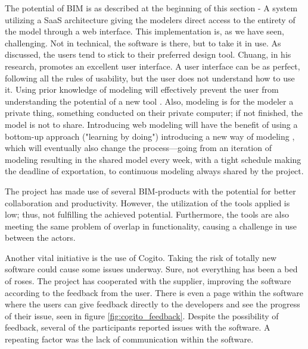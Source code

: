 The potential of BIM is as described at the beginning of this section - A system utilizing a SaaS architecture giving the modelers direct access to the entirety of the model through a web interface. This implementation is, as we have seen, challenging. Not in technical, the software is there, but to take it in use. As discussed, the users tend to stick to their preferred design tool. Chuang, in his research, promotes an excellent user interface. A user interface can be as perfect, following all the rules of usability, but the user does not understand how to use it. Using prior knowledge of modeling will effectively prevent the user from understanding the potential of a new tool \cite{orlikowski1992learning}. Also, modeling is for the modeler a private thing, something conducted on their private computer; if not finished, the model is not to share. Introducing web modeling will have the benefit of using a bottom-up approach ("learning by doing") introducing a new way of modeling \cite{aziz2013applying}, which will eventually also change the process—going from an iteration of modeling resulting in the shared model every week, with a tight schedule making the deadline of exportation, to continuous modeling always shared by the project.

The project has made use of several BIM-products with the potential for better collaboration and productivity. However, the utilization of the tools applied is low; thus, not fulfilling the achieved potential. Furthermore, the tools are also meeting the same problem of overlap in functionality, causing a challenge in use between the actors.

Another vital initiative is the use of Cogito. Taking the risk of totally new software could cause some issues underway. Sure, not everything has been a bed of roses. The project has cooperated with the supplier, improving the software according to the feedback from the user. There is even a page within the software where the users can give feedback directly to the developers and see the progress of their issue, seen in figure \ref{fig:cogito_feedback}. Despite the possibility of feedback, several of the participants reported issues with the software. A repeating factor was the lack of communication within the software. 

